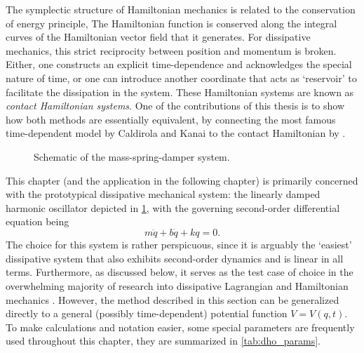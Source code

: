 The symplectic structure of Hamiltonian mechanics is related to the conservation of energy principle, The Hamiltonian function is conserved along the integral curves of the Hamiltonian vector field that it generates. For dissipative mechanics, this strict reciprocity between position and momentum is broken. Either, one constructs an explicit time-dependence and acknowledges the special nature of time, or one can introduce another coordinate that acts as `reservoir' to facilitate the dissipation in the system. These Hamiltonian systems are known as \emph{contact Hamiltonian systems}. One of the contributions of this thesis is to show how both methods are essentially equivalent, by connecting the most famous time-dependent model by Caldirola and Kanai to the contact Hamiltonian by \citet{Bravetti2017}.

\begin{figure}[ht!]
    \begin{center}
        
    \end{center}
    \caption{Schematic of the mass-spring-damper system.}
    \label{fig:dho}
\end{figure}
This chapter (and the application in the following chapter) is primarily concerned with the prototypical dissipative mechanical system: the linearly damped harmonic oscillator depicted in \cref{fig:dho}, with the governing second-order differential equation being
\begin{equation}  
  m\ddot{q} + b\dot{q} + kq = 0.
\end{equation}
The choice for this system is rather perspicuous, since it is arguably the `easiest' dissipative system that also exhibits second-order dynamics and is linear in all terms. Furthermore, as discussed below, it serves as the test case of choice in the overwhelming majority of research into dissipative Lagrangian and Hamiltonian mechanics
\cite{Dekker1981,Hutters2020b}. However, the method described in this section can be generalized directly to a general (possibly time-dependent) potential function $V = V(q, t)$. To make calculations and notation easier, some special parameters are frequently used throughout this chapter, they are summarized in \cref{tab:dho_params}.


